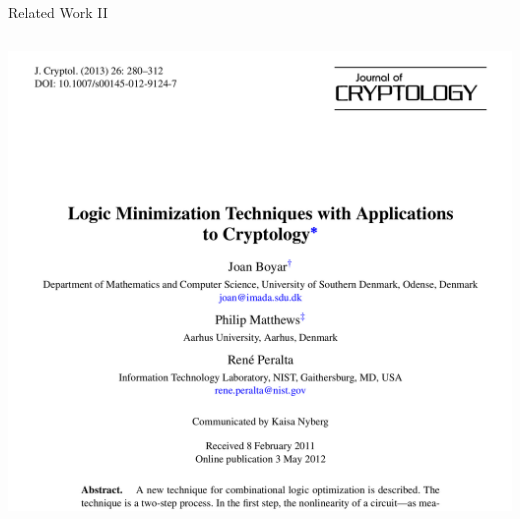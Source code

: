 \begin{frame}{Related Work II}{}
    \begin{columns}
        \begin{column}{0.75\textwidth}
            \centering
            \includegraphics[width=\textwidth]{data/joc}
        \end{column}
    \end{columns}
\end{frame}

